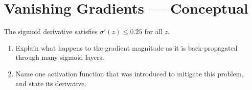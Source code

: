 \documentclass[11pt, a4paper]{article}
\begin{document}
\vspace{8em}

\section{Vanishing Gradients — Conceptual}

The sigmoid derivative satisfies
$\sigma'(z) \leq 0.25$ for all $z$.

\begin{enumerate}[label=\alph*.]
  \item Explain what happens to the gradient magnitude as it is
        back-propagated through many sigmoid layers.
        \vspace{4em}
  \item Name one activation function that was introduced to mitigate
        this problem, and state its derivative.
        \vspace{4em}
\end{enumerate}
\end{document}
